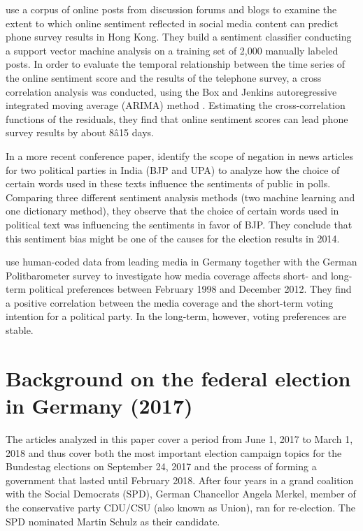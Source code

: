 \documentclass[12pt,a4paper,notitlepage]{article}
\begin{document}
\citet{fu_analyzing_2013} use a corpus of online posts from discussion forums and blogs to examine the extent to which online sentiment reflected in social media content can predict phone survey results in Hong Kong. They build a sentiment classifier conducting a support vector machine analysis on a training set of 2,000 manually labeled posts. In order to evaluate the temporal relationship between the time series of the online sentiment score and the results of the telephone survey, a cross correlation analysis was conducted, using the Box and Jenkins autoregressive integrated moving average (ARIMA) method \citep{box_time_2008}. Estimating the cross-correlation functions of the residuals, they find that online sentiment scores can lead phone survey results by about 8â15 days. 

In a more recent conference paper, \citet{padmaja_evaluating_2014} identify the scope of negation in news articles for two political parties in India (BJP and UPA) to analyze how the choice of certain words used in these texts influence the sentiments of public in polls. Comparing three different sentiment analysis methods (two machine learning and one dictionary method), they observe that the choice of certain words used in political text was influencing the sentiments in favor of BJP. They conclude that this sentiment bias might be one of the causes for the election results in 2014.

\citet{dewenter_can_2018} use human-coded data from leading media in Germany together with the German Politbarometer survey to investigate how media coverage affects short- and long-term political preferences between February 1998 and December 2012. They find a positive correlation between the media coverage and the short-term voting intention for a political party. In the long-term, however, voting preferences are stable. 
 
\section{Background on the federal election in Germany (2017)}\label{ch_elections}

The articles analyzed in this paper cover a period from June 1, 2017 to March 1, 2018 and thus cover both the most important election campaign topics for the Bundestag elections on September 24, 2017 and the process of forming a government that lasted until February 2018. After four years in a grand coalition with the Social Democrats (SPD), German Chancellor Angela Merkel, member of the conservative party CDU/CSU (also known as Union), ran for re-election. The SPD nominated Martin Schulz as their candidate. 
\end{document}
